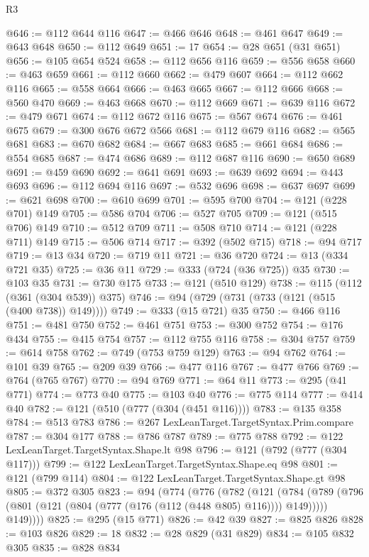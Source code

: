 \begin{lexlean}{R3}
\begin{coremodule}
@646 := @112 @644 @116
@647 := @466 @646
@648 := @461 @647
@649 := @643 @648
@650 := @112 @649
@651 := 17
@654 := @28 @651 (@31 @651)
@656 := @105 @654 @524
@658 := @112 @656 @116
@659 := @556 @658
@660 := @463 @659
@661 := @112 @660
@662 := @479 @607
@664 := @112 @662 @116
@665 := @558 @664
@666 := @463 @665
@667 := @112 @666
@668 := @560 @470
@669 := @463 @668
@670 := @112 @669
@671 := @639 @116
@672 := @479 @671
@674 := @112 @672 @116
@675 := @567 @674
@676 := @461 @675
@679 := @300 @676 @672 @566
@681 := @112 @679 @116
@682 := @565 @681
@683 := @670 @682
@684 := @667 @683
@685 := @661 @684
@686 := @554 @685
@687 := @474 @686
@689 := @112 @687 @116
@690 := @650 @689
@691 := @459 @690
@692 := @641 @691
@693 := @639 @692
@694 := @443 @693
@696 := @112 @694 @116
@697 := @532 @696
@698 := @637 @697
@699 := @621 @698
@700 := @610 @699
@701 := @595 @700
@704 := @121 (@228 @701) @149
@705 := @586 @704
@706 := @527 @705
@709 := @121 (@515 @706) @149
@710 := @512 @709
@711 := @508 @710
@714 := @121 (@228 @711) @149
@715 := @506 @714
@717 := @392 (@502 @715)
@718 := @94 @717
@719 := @13 @34
@720 := @719 @11
@721 := @36 @720
@724 := @13 (@334 @721 @35)
@725 := @36 @11
@729 := @333 (@724 (@36 @725)) @35
@730 := @103 @35
@731 := @730 @175
@733 := @121 (@510 @129)
@738 := @115 (@112 (@361 (@304 @539)) @375)
@746 := @94 (@729 (@731 (@733 (@121 (@515 (@400 @738)) @149))))
@749 := @333 (@15 @721) @35
@750 := @466 @116
@751 := @481 @750
@752 := @461 @751
@753 := @300 @752
@754 := @176 @434
@755 := @415 @754
@757 := @112 @755 @116
@758 := @304 @757
@759 := @614 @758
@762 := @749 (@753 @759 @129)
@763 := @94 @762
@764 := @101 @39
@765 := @209 @39
@766 := @477 @116
@767 := @477 @766
@769 := @764 (@765 @767)
@770 := @94 @769
@771 := @64 @11
@773 := @295 (@41 @771)
@774 := @773 @40
@775 := @103 @40
@776 := @775 @114
@777 := @414 @40
@782 := @121 (@510 (@777 (@304 (@451 @116))))
@783 := @135 @358
@784 := @513 @783
@786 := @267 LexLeanTarget.TargetSyntax.Prim.compare
@787 := @304 @177
@788 := @786 @787
@789 := @775 @788
@792 := @122 LexLeanTarget.TargetSyntax.Shape.lt @98
@796 := @121 (@792 (@777 (@304 @117)))
@799 := @122 LexLeanTarget.TargetSyntax.Shape.eq @98
@801 := @121 (@799 @114)
@804 := @122 LexLeanTarget.TargetSyntax.Shape.gt @98
@805 := @372 @305
@823 := @94
    (@774
      (@776
        (@782
          (@121
            (@784 (@789 (@796 (@801 (@121 (@804 (@777 (@176 (@112 (@448 @805) @116)))) @149)))))
            @149))))
@825 := @295 (@15 @771)
@826 := @42 @39
@827 := @825 @826
@828 := @103 @826
@829 := 18
@832 := @28 @829 (@31 @829)
@834 := @105 @832 @305
@835 := @828 @834

\end{coremodule}
\end{lexlean}
